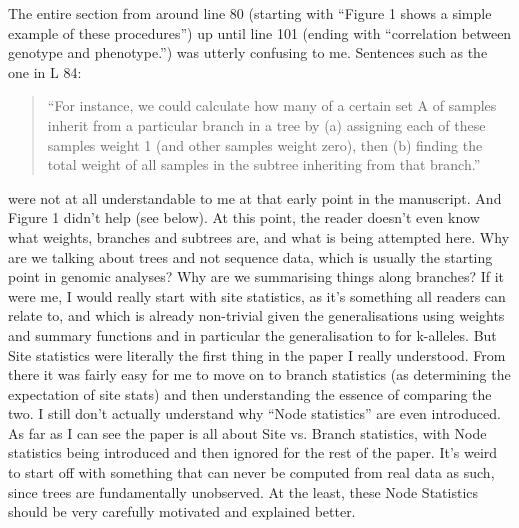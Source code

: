 \begin{point}{}
The entire section from around line 80 (starting with ``Figure 1 shows a simple example of these procedures'') up until line 101 (ending with ``correlation between genotype and phenotype.'') was utterly confusing to me. Sentences such as the one in L 84:
    \begin{quote}
``For instance, we could calculate how many of a certain set A of samples inherit from a particular branch in a tree by (a) assigning each of these samples weight 1 (and other samples weight zero), then (b) finding the total weight of all samples in the subtree inheriting from that branch.''
    \end{quote}
were not at all understandable to me at that early point in the manuscript. And Figure 1 didn't help (see below). At this point, the reader doesn't even know what weights, branches and subtrees are, and what is being attempted here. Why are we talking about trees and not sequence data, which is usually the starting point in genomic analyses? Why are we summarising things along branches? If it were me, I would really start with site statistics, as it's something all readers can relate to, and which is already non-trivial given the generalisations using weights and summary functions and in particular the generalisation to for k-alleles. But Site statistics were literally the first thing in the paper I really understood. From there it was fairly easy for me to move on to branch statistics (as determining the expectation of site stats) and then understanding the essence of comparing the two. I still don't actually understand why ``Node statistics'' are even introduced. As far as I can see the paper is all about Site vs. Branch statistics, with Node statistics being introduced and then ignored for the rest of the paper. It's weird to start off with something that can never be computed from real data as such, since trees are fundamentally unobserved. At the least, these Node Statistics should be very carefully motivated and explained better.
\end{point}


